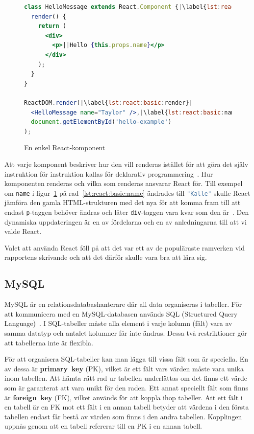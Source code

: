 \documentclass[a4paper,12pt]{article}
\newcommand{\li}{\lstinline}
\begin{document}
\begin{figure}[htbp]
\centering
\begin{lstlisting}[language=jsx,morekeywords={[3]<HelloMessage}]
class HelloMessage extends React.Component {|\label{lst:react:basic:class}|
  render() {
    return (
      <div>
        <p>||Hello {this.props.name}</p>
      </div>
    );
  }
}

ReactDOM.render(|\label{lst:react:basic:render}|
  <HelloMessage name="Taylor" />,|\label{lst:react:basic:name}|
  document.getElementById('hello-example')
);
\end{lstlisting}
\caption{En enkel React-komponent}
\label{lst:react:basic}
\end{figure}

Att varje komponent beskriver hur den vill renderas istället för att göra det själv instruktion för instruktion kallas för deklarativ programmering~\cite{web:wikipedia:declarative}. Hur komponenten renderas och vilka som renderas ansvarar React för. Till exempel om \li{name} i figur~\ref{lst:react:basic} på rad~\ref{lst:react:basic:name} ändrades till \li[language=jsx]{"Kalle"} skulle React jämföra den gamla HTML-strukturen med det nya för att komma fram till att endast \li{p}-taggen behöver ändras och låter \li{div}-taggen vara kvar som den är~\cite{web:react}. Den dynamiska uppdateringen är en av fördelarna och en av anledningarna till att vi valde React.

Valet att använda React föll på att det var ett av de populäraste ramverken vid rapportens skrivande och att det därför skulle vara bra att lära sig.
\FloatBarrier

\subsection{MySQL}
\label{sec:sql}
MySQL är en relationsdatabashanterare där all data organiseras i tabeller. För att kommunicera med en MySQL-databasen används SQL (Structured Query Language)~\cite{web:MySQL}. I SQL-tabeller måste alla element i varje kolumn (fält) vara av samma datatyp och antalet kolumner får inte ändras. Dessa två restriktioner gör att tabellerna inte är flexibla.

För att organisera SQL-tabeller kan man lägga till vissa fält som är speciella. En av dessa är \mbox{\textbf{primary key}} (PK), vilket är ett fält vars värden måste vara unika inom tabellen. Att hämta rätt rad ur tabellen underlättas om det finns ett värde som är garanterat att vara unikt för den raden. Ett annat speciellt fält som finns är \mbox{\textbf{foreign key}} (FK), vilket används för att koppla ihop tabeller. Att ett fält i en tabell är en FK mot ett fält i en annan tabell betyder att värdena i den första tabellen endast får bestå av värden som finns i den andra tabellen. Kopplingen uppnås genom att en tabell refererar till en PK i en annan tabell.
\end{document}
